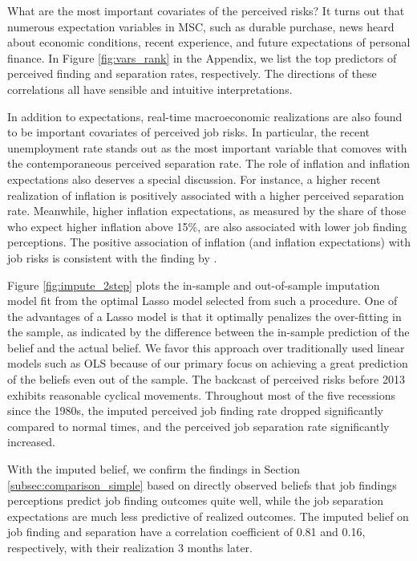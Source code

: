 
What are the most important covariates of the perceived risks? It turns out that numerous expectation variables in MSC, such as durable purchase, news heard about economic conditions, recent experience, and future expectations of personal finance. In Figure \ref{fig:vars_rank} in the Appendix, we list the top predictors of perceived finding and separation rates, respectively. The directions of these correlations all have sensible and intuitive interpretations.  

In addition to expectations, real-time macroeconomic realizations are also found to be important covariates of perceived job risks. In particular, the recent unemployment rate stands out as the most important variable that comoves with the contemporaneous perceived separation rate. The role of inflation and inflation expectations also deserves a special discussion. For instance, a higher recent realization of inflation is positively associated with a higher perceived separation rate. Meanwhile, higher inflation expectations, as measured by the share of those who expect higher inflation above 15\%, are also associated with lower job finding perceptions. The positive association of inflation (and inflation expectations) with job risks is consistent with the finding by \cite{hou2024subjective}.  

Figure \ref{fig:impute_2step} plots the in-sample and out-of-sample imputation model fit from the optimal Lasso model selected from such a procedure. One of the advantages of a Lasso model is that it optimally penalizes the over-fitting in the sample, as indicated by the difference between the in-sample prediction of the belief and the actual belief. We favor this approach over traditionally used linear models such as OLS because of our primary focus on achieving a great prediction of the beliefs even out of the sample. The backcast of perceived risks before 2013 exhibits reasonable cyclical movements. Throughout most of the five recessions since the 1980s, the imputed perceived job finding rate dropped significantly compared to normal times, and the perceived job separation rate significantly increased. 

With the imputed belief, we confirm the findings in  Section \ref{subsec:comparison_simple} based on directly observed beliefs that job findings perceptions predict job finding outcomes quite well, while the job separation expectations are much less predictive of realized outcomes. The imputed belief on job finding and separation have a correlation coefficient of 0.81 and 0.16, respectively, with their realization 3 months later. 

